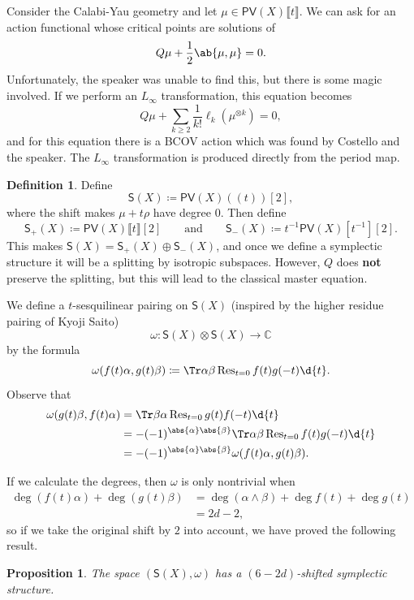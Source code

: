 \documentclass{amsart}
\newtheorem{prop}[thm]{Proposition}
\theoremstyle{definition}
\newtheorem{defn}[thm]{Definition}
\theoremstyle{remark}
\theoremstyle{plain}
\theoremstyle{definition}
\theoremstyle{remark}
\newcommand{\C}{\mathbb{C}}
\newcommand{\on}[1]{\operatorname{#1}}
\newcommand{\ms}[1]{\mathsf{#1}}
\newcommand{\1}{\mathbf{1}}
\newcommand{\2}{\mathbf{2}}
\newcommand{\3}{\mathbf{3}}
\newcommand{\ps}[1]{\lBrack #1 \rBrack}
\newcommand{\ls}[1]{(\!( #1 )\!)}
\begin{document}
Consider the Calabi-Yau geometry and let \(\mu \in \ms{PV}(X)\ps{t}\). We can ask for an action functional whose critical points are solutions of
\[ Q \mu + \frac{1}{2} \ab\{\mu, \mu\} = 0. \]
Unfortunately, the speaker was unable to find this, but there is some magic involved. If we perform an \(L_{\infty}\) transformation, this equation becomes
\[ Q \mu + \sum_{k \geq 2} \frac{1}{k!} \ell_k (\mu^{\otimes k}) = 0, \]
and for this equation there is a BCOV action which was found by Costello and the speaker. The \(L_{\infty}\) transformation is produced directly from the period map.

\begin{defn}
    Define
    \[ \ms{S}(X) \coloneqq \ms{PV}(X) \ls{t}[2], \]
    where the shift makes \(\mu + t \rho\) have degree \(0\). Then define
    \[ \ms{S}_+(X) \coloneqq \ms{PV}(X) \ps{t}[2] \qquad \text{and} \qquad \ms{S}_-(X) \coloneqq t^{-1} \ms{PV}(X)[{t^{-1}}][2]. \]
    This makes \(\ms{S}(X) = \ms{S}_+(X) \oplus \ms{S}_-(X)\), and once we define a symplectic structure it will be a splitting by isotropic subspaces. However, \(Q\) does \textbf{not} preserve the splitting, but this will lead to the classical master equation.

    We define a \(t\)-sesquilinear pairing on \(\ms{S}(X)\) (inspired by the higher residue pairing of Kyoji Saito)
    \[ \omega \colon \ms{S}(X) \otimes \ms{S}(X) \to \C \]
    by the formula
    \[ \omega(f(t) \alpha, g(t) \beta) \coloneqq \Tr \alpha\beta \on{Res}_{t = 0} f(t) g(-t) \d{t}. \]
    Observe that
    \begin{align*}
        \omega (g(t) \beta, f(t) \alpha) &= \Tr \beta\alpha \on{Res}_{t = 0} g(t) f(-t) \d{t} \\
        &= - (-1)^{\abs{\alpha} \abs{\beta}} \Tr \alpha\beta \on{Res}_{t = 0} f(t) g(-t) \d{t} \\
        &= - (-1)^{\abs{\alpha} \abs{\beta}} \omega(f(t) \alpha, g(t) \beta).
    \end{align*}
\end{defn}

If we calculate the degrees, then \(\omega\) is only nontrivial when 
\begin{align*}
    \deg (f(t) \alpha) + \deg (g(t) \beta) &= \deg (\alpha \wedge \beta) + \deg f(t) + \deg g(t) \\
    &= 2d - 2,
\end{align*}
so if we take the original shift by \(2\) into account, we have proved the following result.

\begin{prop}
    The space \((\ms{S}(X), \omega)\) has a \((6-2d)\)-shifted symplectic structure.
\end{prop}
\end{document}
